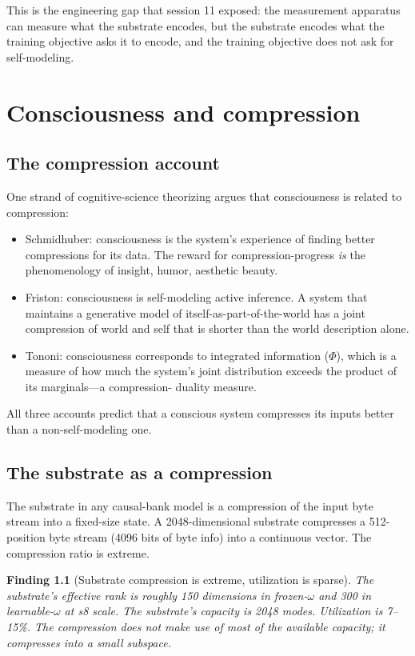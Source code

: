 \documentclass[11pt,openany]{book}
\newtheorem{finding}{Finding}[chapter]
\begin{document}
This is the engineering gap that session 11 exposed: the measurement
apparatus can measure what the substrate encodes, but the substrate
encodes what the training objective asks it to encode, and the
training objective does not ask for self-modeling.

\chapter{Consciousness and compression}

\section{The compression account}

One strand of cognitive-science theorizing argues that consciousness
is related to compression:

\begin{itemize}
  \item Schmidhuber: consciousness is the system's experience of
  finding better compressions for its data. The reward for
  compression-progress \emph{is} the phenomenology of insight, humor,
  aesthetic beauty.
  \item Friston: consciousness is self-modeling active inference. A
  system that maintains a generative model of itself-as-part-of-the-world
  has a joint compression of world and self that is shorter than the
  world description alone.
  \item Tononi: consciousness corresponds to integrated information
  ($\Phi$), which is a measure of how much the system's joint
  distribution exceeds the product of its marginals---a compression-
  duality measure.
\end{itemize}

All three accounts predict that a conscious system compresses its
inputs better than a non-self-modeling one.

\section{The substrate as a compression}

The substrate in any causal-bank model is a compression of the input
byte stream into a fixed-size state. A 2048-dimensional substrate
compresses a 512-position byte stream (4096 bits of byte info) into
a continuous vector. The compression ratio is extreme.

\begin{finding}[Substrate compression is extreme, utilization is sparse]
The substrate's effective rank is roughly 150 dimensions in
frozen-$\omega$ and 300 in learnable-$\omega$ at s8 scale. The
substrate's capacity is 2048 modes. Utilization is 7--15\%. The
compression does not make use of most of the available capacity;
it compresses into a small subspace.
\end{finding}
\end{document}
